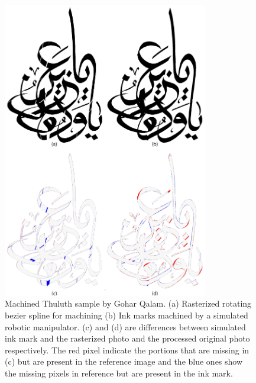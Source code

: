 {\begin{figure}[H]
  \centering
  \includegraphics[width=0.8\textwidth]{../Images/Thuluth_Machined.pdf}
  \caption
  {
      Machined Thuluth sample by Gohar Qalam. (a) Rasterized rotating bezier spline for machining (b) Ink marks machined by a simulated robotic manipulator. (c) and (d) are differences between simulated ink mark and the rasterized photo and the processed original photo respectively. The red pixel indicate the portions that are missing in (c) but are present in the reference image and the blue ones show the missing pixels in reference but are present in the ink mark.
  }
\end{figure}
} 